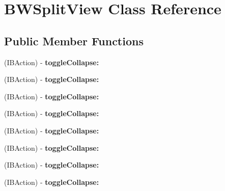 \hypertarget{interface_b_w_split_view}{
\section{\-B\-W\-Split\-View \-Class \-Reference}
\label{interface_b_w_split_view}
}
\subsection*{\-Public \-Member \-Functions}
\begin{DoxyCompactItemize}
\item 
\hypertarget{interface_b_w_split_view_a8db111a6aba214c1b60dd3fa925f624b}{
(\-I\-B\-Action) -\/ {\bfseries toggle\-Collapse\-:}}
\label{interface_b_w_split_view_a8db111a6aba214c1b60dd3fa925f624b}

\item 
\hypertarget{interface_b_w_split_view_a8db111a6aba214c1b60dd3fa925f624b}{
(\-I\-B\-Action) -\/ {\bfseries toggle\-Collapse\-:}}
\label{interface_b_w_split_view_a8db111a6aba214c1b60dd3fa925f624b}

\item 
\hypertarget{interface_b_w_split_view_a8db111a6aba214c1b60dd3fa925f624b}{
(\-I\-B\-Action) -\/ {\bfseries toggle\-Collapse\-:}}
\label{interface_b_w_split_view_a8db111a6aba214c1b60dd3fa925f624b}

\item 
\hypertarget{interface_b_w_split_view_a8db111a6aba214c1b60dd3fa925f624b}{
(\-I\-B\-Action) -\/ {\bfseries toggle\-Collapse\-:}}
\label{interface_b_w_split_view_a8db111a6aba214c1b60dd3fa925f624b}

\item 
\hypertarget{interface_b_w_split_view_a8db111a6aba214c1b60dd3fa925f624b}{
(\-I\-B\-Action) -\/ {\bfseries toggle\-Collapse\-:}}
\label{interface_b_w_split_view_a8db111a6aba214c1b60dd3fa925f624b}

\item 
\hypertarget{interface_b_w_split_view_a8db111a6aba214c1b60dd3fa925f624b}{
(\-I\-B\-Action) -\/ {\bfseries toggle\-Collapse\-:}}
\label{interface_b_w_split_view_a8db111a6aba214c1b60dd3fa925f624b}

\item 
\hypertarget{interface_b_w_split_view_a8db111a6aba214c1b60dd3fa925f624b}{
(\-I\-B\-Action) -\/ {\bfseries toggle\-Collapse\-:}}
\label{interface_b_w_split_view_a8db111a6aba214c1b60dd3fa925f624b}

\item 
\hypertarget{interface_b_w_split_view_a8db111a6aba214c1b60dd3fa925f624b}{
(\-I\-B\-Action) -\/ {\bfseries toggle\-Collapse\-:}}
\label{interface_b_w_split_view_a8db111a6aba214c1b60dd3fa925f624b}


\end{DoxyCompactItemize}
